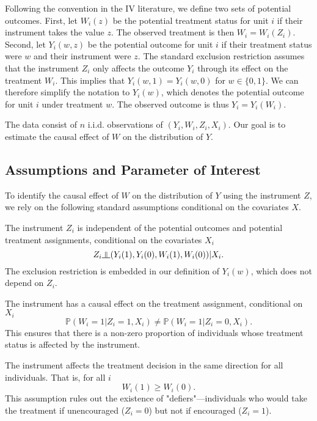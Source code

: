 \documentclass[final,3p,fleqn, 10pt]{elsarticle}
\begin{document}
Following the convention in the IV literature, we define two sets of potential outcomes. First, let $W_i(z)$ be the potential treatment status for unit $i$ if their instrument takes the value $z$. The observed treatment is then $W_i = W_i(Z_i)$. Second, let $Y_i(w, z)$ be the potential outcome for unit $i$ if their treatment status were $w$ and their instrument were $z$. The standard exclusion restriction assumes that the instrument $Z_i$ only affects the outcome $Y_i$ through its effect on the treatment $W_i$. This implies that $Y_i(w, 1) = Y_i(w, 0)$ for $w \in \{0, 1\}$. We can therefore simplify the notation to $Y_i(w)$, which denotes the potential outcome for unit $i$ under treatment $w$. The observed outcome is thus $Y_i = Y_i(W_i)$.

The data consist of $n$ i.i.d. observations of $(Y_i, W_i, Z_i, X_i)$. Our goal is to estimate the causal effect of $W$ on the distribution of $Y$.

\subsection{Assumptions and Parameter of Interest}

To identify the causal effect of $W$ on the distribution of $Y$ using the instrument $Z$, we rely on the following standard assumptions conditional on the covariates $X$.

\begin{assumption} \label{ass:independence}
The instrument $Z_i$ is independent of the potential outcomes and potential treatment assignments, conditional on the covariates $X_i$
$$ Z_i \indep (Y_i(1), Y_i(0), W_i(1), W_i(0)) | X_i. $$
The exclusion restriction is embedded in our definition of $Y_i(w)$, which does not depend on $Z_i$.
\end{assumption}

\begin{assumption}[Relevance] \label{ass:relevance}
The instrument has a causal effect on the treatment assignment, conditional on $X_i$
$$ \mathbb{P}(W_i=1 | Z_i=1, X_i) \neq \mathbb{P}(W_i=1 | Z_i=0, X_i). $$
This ensures that there is a non-zero proportion of individuals whose treatment status is affected by the instrument.
\end{assumption}

\begin{assumption}[Monotonicity] \label{ass:monotonicity}
The instrument affects the treatment decision in the same direction for all individuals. That is, for all $i$
$$ W_i(1) \ge W_i(0). $$
This assumption rules out the existence of "defiers"—individuals who would take the treatment if unencouraged ($Z_i=0$) but not if encouraged ($Z_i=1$).
\end{assumption}
\end{document}
